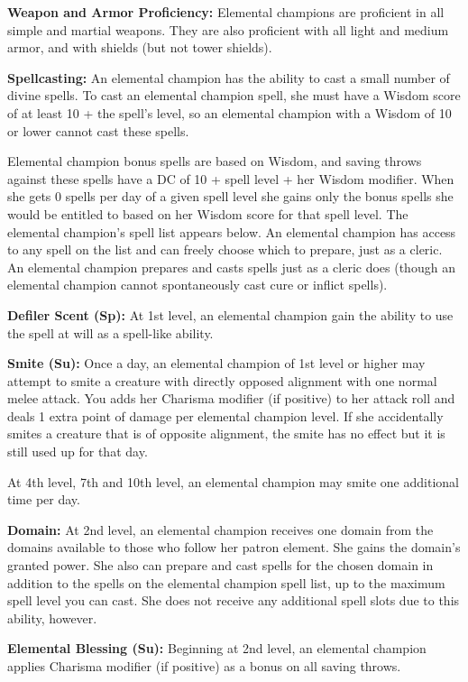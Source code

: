 {
\textbf{Weapon and Armor Proficiency:} Elemental champions are proficient in all simple and martial weapons. They are also proficient with all light and medium armor, and with shields (but not tower shields).

\textbf{Spellcasting:} An elemental champion has the ability to cast a small number of divine spells. To cast an elemental champion spell, she must have a Wisdom score of at least 10 + the spell's level, so an elemental champion with a Wisdom of 10 or lower cannot cast these spells.

Elemental champion bonus spells are based on Wisdom, and saving throws against these spells have a DC of 10 + spell level + her Wisdom modifier. When she gets 0 spells per day of a given spell level she gains only the bonus spells she would be entitled to based on her Wisdom score for that spell level. The elemental champion's spell list appears below. An elemental champion has access to any spell on the list and can freely choose which to prepare, just as a cleric. An elemental champion prepares and casts spells just as a cleric does (though an elemental champion cannot spontaneously cast cure or inflict spells).

\textbf{Defiler Scent (Sp):} At 1st level, an elemental champion gain the ability to use the  spell at will as a spell-like ability.

\textbf{Smite (Su):} Once a day, an elemental champion of 1st level or higher may attempt to smite a creature with directly opposed alignment with one normal melee attack. You adds her Charisma modifier (if positive) to her attack roll and deals 1 extra point of damage per elemental champion level. If she accidentally smites a creature that is of opposite alignment, the smite has no effect but it is still used up for that day.

At 4th level, 7th and 10th level, an elemental champion may smite one additional time per day.

\textbf{Domain:} At 2nd level, an elemental champion receives one domain from the domains available to those who follow her patron element. She gains the domain's granted power. She also can prepare and cast spells for the chosen domain in addition to the spells on the elemental champion spell list, up to the maximum spell level you can cast. She does not receive any additional spell slots due to this ability, however.

\textbf{Elemental Blessing (Su):} Beginning at 2nd level, an elemental champion applies  Charisma modifier (if positive) as a bonus on all saving throws.

}
